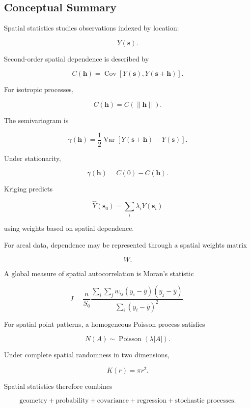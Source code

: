\subsection{Conceptual Summary}
\label{subsec:spatial-summary}

Spatial statistics studies observations indexed by location:

\[
\boxed{
Y(\mathbf{s}).
}
\]

Second-order spatial dependence is described by

\[
\boxed{
C(\mathbf{h})
=
\operatorname{Cov}
[
Y(\mathbf{s}),
Y(\mathbf{s}+\mathbf{h})
].
}
\]

For isotropic processes,

\[
\boxed{
C(\mathbf{h})
=
C
(
\|\mathbf{h}\|
).
}
\]

The semivariogram is

\[
\boxed{
\gamma(\mathbf{h})
=
\frac12
\operatorname{Var}
[
Y(\mathbf{s}+\mathbf{h})
-
Y(\mathbf{s})
].
}
\]

Under stationarity,

\[
\boxed{
\gamma(\mathbf{h})
=
C(0)-C(\mathbf{h}).
}
\]

Kriging predicts

\[
\boxed{
\widehat{Y}
(
\mathbf{s}_0
)
=
\sum_i
\lambda_i
Y
(
\mathbf{s}_i
)
}
\]

using weights based on spatial dependence.

For areal data, dependence may be represented through a spatial weights
matrix

\[
\boxed{
W.
}
\]

A global measure of spatial autocorrelation is Moran's statistic

\[
\boxed{
I
=
\frac{
n
}{
S_0
}
\frac{
\sum_i\sum_j
w_{ij}
(
y_i-\overline{y}
)
(
y_j-\overline{y}
)
}{
\sum_i
(
y_i-\overline{y}
)^2
}.
}
\]

For spatial point patterns, a homogeneous Poisson process satisfies

\[
\boxed{
N(A)
\sim
\operatorname{Poisson}
(
\lambda|A|
).
}
\]

Under complete spatial randomness in two dimensions,

\[
\boxed{
K(r)
=
\pi r^2.
}
\]

Spatial statistics therefore combines

\[
\boxed{
\text{geometry}
+
\text{probability}
+
\text{covariance}
+
\text{regression}
+
\text{stochastic processes}.
}
\]

